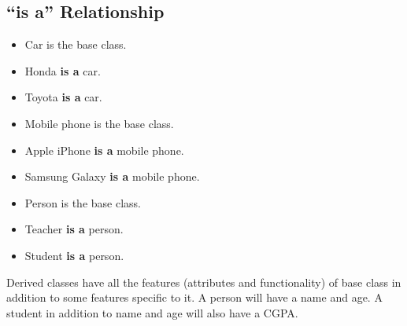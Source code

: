 \documentclass[12pt,a4paper]{article}
\begin{document}
\subsection{``is a'' Relationship}
\begin{itemize}
\item Car is the base class.
\item Honda \textbf{is a} car.
\item Toyota \textbf{is a} car.
\end{itemize}
\begin{itemize}
\item Mobile phone is the base class.
\item Apple iPhone \textbf{is a} mobile phone.
\item Samsung Galaxy \textbf{is a} mobile phone.
\end{itemize}
\begin{itemize}
\item Person is the base class.
\item Teacher \textbf{is a} person.
\item Student \textbf{is a} person.
\end{itemize}
Derived classes have all the features (attributes and functionality) of base class in addition to some features specific to it. A person will have a name and age. A student in addition to name and age will also have a CGPA.
\end{document}
